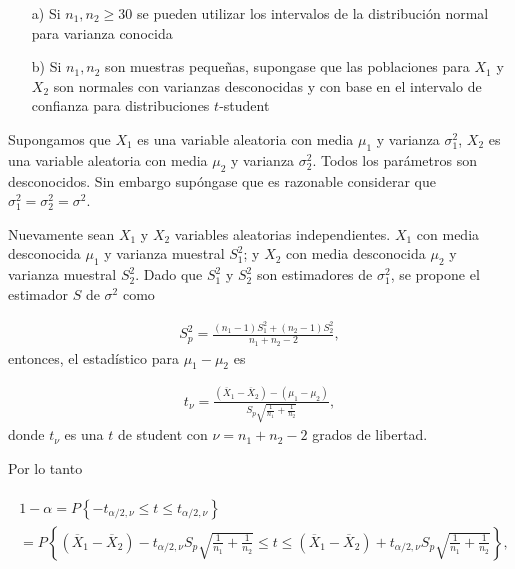 \documentclass[a4paper]{report} %
\begin{document}
\begin{itemize}
\item[a) ] Si $n_{1},n_{2}\geq30$ se pueden utilizar los intervalos de la distribuci\'on normal para varianza conocida

\item[b) ] Si $n_{1},n_{2}$ son muestras peque\~nas, supongase que las poblaciones para $X_{1}$ y $X_{2}$ son normales con varianzas desconocidas y con base en el intervalo de confianza para distribuciones $t$-student
\end{itemize}


Supongamos que $X_{1}$ es una variable aleatoria con media $\mu_{1}$ y varianza $\sigma_{1}^{2}$, $X_{2}$ es una variable aleatoria con media $\mu_{2}$ y varianza $\sigma_{2}^{2}$. Todos los par\'ametros son desconocidos. Sin embargo sup\'ongase que es razonable considerar que $\sigma_{1}^{2}=\sigma_{2}^{2}=\sigma^{2}$.\medskip

Nuevamente sean $X_{1}$ y $X_{2}$ variables aleatorias independientes. $X_{1}$ con media desconocida $\mu_{1}$ y varianza muestral $S_{1}^{2}$; y $X_{2}$ con media desconocida $\mu_{2}$ y varianza muestral $S_{2}^{2}$. Dado que $S_{1}^{2}$ y $S_{2}^{2}$ son estimadores de $\sigma_{1}^{2}$, se propone el estimador $S$ de $\sigma^{2}$ como 

\begin{eqnarray}
S_{p}^{2}=\frac{\left(n_{1}-1\right)S_{1}^{2}+\left(n_{2}-1\right)S_{2}^{2}}{n_{1}+n_{2}-2},
\end{eqnarray}
entonces, el estad\'istico para $\mu_{1}-\mu_{2}$ es

\begin{eqnarray}
t_{\nu}=\frac{\left(\overline{X}_{1}-\overline{X}_{2}\right)-\left(\mu_{1}-\mu_{2}\right)}{S_{p}\sqrt{\frac{1}{n_{1}}+\frac{1}{n_{2}}}},
\end{eqnarray}
donde $t_{\nu}$ es una $t$ de student con $\nu=n_{1}+n_{2}-2$ grados de libertad.\medskip

Por lo tanto

\begin{eqnarray}
\begin{array}{l}
1-\alpha=P\left\{-t_{\alpha/2,\nu}\leq t\leq t_{\alpha/2,\nu}\right\}\\
=P\left\{\left(\overline{X}_{1}-\overline{X}_{2}\right)-t_{\alpha/2,\nu}S_{p}\sqrt{\frac{1}{n_{1}}+\frac{1}{n_{2}}}\leq t\leq\left(\overline{X}_{1}-\overline{X}_{2}\right)+ t_{\alpha/2,\nu}S_{p}\sqrt{\frac{1}{n_{1}}+\frac{1}{n_{2}}}\right\},
\end{array}
\end{eqnarray}
\end{document}
